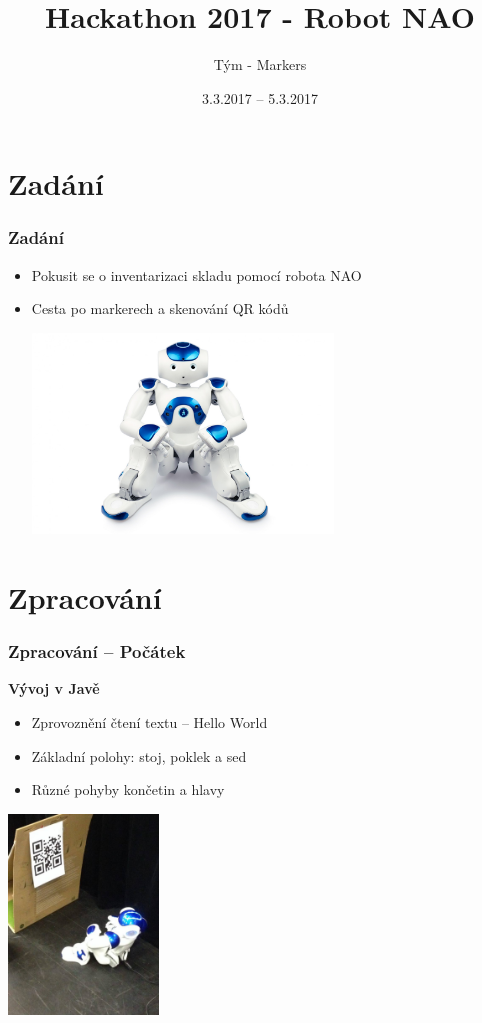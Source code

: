 \documentclass{beamer}
\title{Hackathon 2017 - Robot NAO}
\author{Tým - Markers}
\date{3.3.2017 -- 5.3.2017}
\begin{document}
\begin{frame}
  \titlepage
\end{frame}


\section{Zadání}
\begin{frame}
\frametitle{Zadání}  
	\begin{itemize}
		\item{Pokusit se o inventarizaci skladu pomocí robota NAO}
		\item{Cesta po markerech a skenování QR kódů}
		
		\includegraphics[width=8cm]{img/nao.jpg}
		
	\end{itemize}
 
\end{frame}

\section{Zpracování}
\begin{frame}
\frametitle{Zpracování -- Počátek}  
	\textbf{Vývoj v Javě}
	\begin{itemize}		
	
		\item{Zprovoznění čtení textu -- Hello World}
		\item{Základní polohy: stoj, poklek a sed}
		\item{Různé pohyby končetin a hlavy}			
				
	\end{itemize}
	\includegraphics[width=4cm]{img/nao_kouka.jpg}

 
\end{frame}
\end{document}
